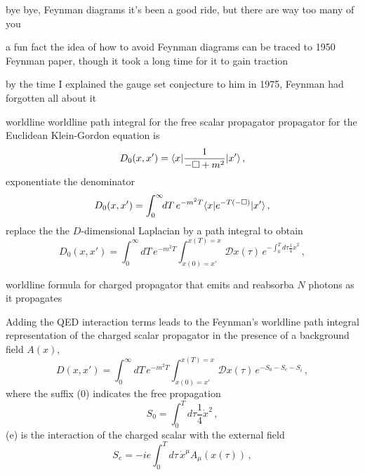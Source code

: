 \begin{frame}{bye bye, Feynman diagrams}
it's been a good ride, but there are way too many of you
\end{frame}

\begin{frame}{a fun fact}
the idea of how to avoid Feynman diagrams can be traced to 1950 Feynman
paper, though it took a long time for it to gain
traction

\bigskip

by the time I explained the gauge set conjecture to
him in 1975, Feynman had forgotten all about it
\end{frame}

\begin{frame}{worldline worldline path integral for the free scalar propagator}
propagator for the Euclidean
Klein-Gordon equation is
\[ %
D_0(x,x')=\bra{x}\frac{1}{-\Box +m^2}\ket{x'}
\,,
\] %
exponentiate the
denominator
\[ %
D_0(x,x')=\int_0^\infty\!\!dT\,{e}^{-m^2T}\bra{x}e^{-T(-\Box)}\ket{x'}
\,,
\] %
replace the the $D$-dimensional Laplacian by a path integral
to obtain
\[ %
D_0(x,x')=\int_0^\infty\!\!dT\,e^{-m^2T}
\int_{x(0)=x'}^{x(T)=x}\!\!\!\!\mathcal{D}x(\tau)\,
    e^{-\int_0^T\!\!d\tau \frac{1}{4}\dot{x}^2}
\,,
\] %
\end{frame}

\begin{frame}{worldline formula for charged propagator}
that emits and reabsorba $N$ photons as it
propagates%

\medskip

Adding the QED
interaction terms leads to the Feynman's worldline path integral
representation of the charged scalar propagator
in the presence of a background field $A(x)$,
\[ %
D(x,x')=\int_0^\infty\!\!dT\,e^{-m^2T}
    \int_{x(0)=x'}^{x(T)=x}\!\!\mathcal{D}x(\tau)\,
            {e}^{-S_0-S_e-S_i}
\,,
\] %
where the suffix (0) indicates the free propagation
\[ %
S_0 = \int_0^T\!\!d\tau \frac{1}{4}\dot{x}^2
\,,
\] %
(e) is the interaction of the charged scalar with the external field
\[ %
S_e = -ie\int_0^T\!\!d\tau\,\dot{x}^\mu A_\mu(x(\tau))
\,,
\] %
\end{frame}

